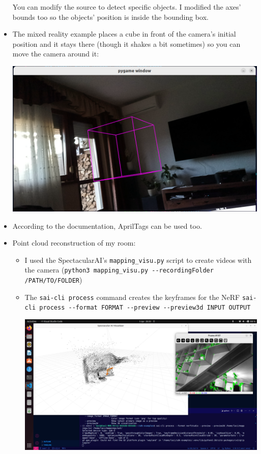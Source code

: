 \documentclass{article}
\begin{document}
\begin{itemize}
\begin{minipage}{\linewidth}
    \end{minipage}\par
    You can modify the source to detect specific objects. I modified the axes' bounds too so the objects' position is inside the bounding box.
    \item The mixed reality example places a cube in front of the camera's initial position and it stays there (though it shakes a bit sometimes) so you can move the camera around it:\par
    \begin{minipage}{\linewidth}
        \centering
        \includegraphics[width=1\linewidth]{images/spectacular_ai_mixed_reality.png}
    \end{minipage}\par
    \item According to the documentation, AprilTags can be used too.
    \item Point cloud reconstruction of my room:
    \begin{itemize}
        \item I used the SpectacularAI's \verb|mapping_visu.py| script to create videos with the camera (\verb|python3 mapping_visu.py --recordingFolder /PATH/TO/FOLDER|)
        \item The \verb|sai-cli process| command creates the keyframes for the NeRF \verb|sai-cli process --format FORMAT --preview --preview3d INPUT OUTPUT|\par
        \begin{minipage}{\linewidth}
            \centering
            \includegraphics[width=1\linewidth]{images/sai-cli_process.png}

\end{minipage}
\end{itemize}
\end{itemize}
\end{document}
